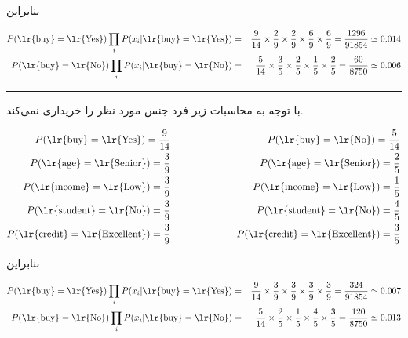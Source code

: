 \documentclass{article}
\begin{document}
بنابراین

\begin{eqnarray*}
    P(\text{\lr{buy}}=\text{\lr{Yes}})\prod_{i} P(x_i|\text{\lr{buy}}=\text{\lr{Yes}}) & = &  \frac{9}{14} \times \frac{2}{9} \times \frac{2}{9} \times \frac{6}{9} \times \frac{6}{9} =  \frac{1296}{91854} \simeq 0.014\\
    P(\text{\lr{buy}}=\text{\lr{No}})\prod_{i} P(x_i|\text{\lr{buy}}=\text{\lr{No}})  & = & \frac{5}{14} \times \frac{3}{5} \times \frac{2}{5} \times \frac{1}{5} \times \frac{2}{5} = \frac{60}{8750} \simeq 0.006
\end{eqnarray*}

\begin{center}
\rule{0.5\linewidth}{0.1pt}
\end{center}

با توجه به محاسبات زیر فرد  جنس مورد نظر را خریداری نمی‌کند.

\begin{eqnarray*}
    P(\text{\lr{buy}}=\text{\lr{Yes}}) = \frac{9}{14} & \hspace{2cm} & P(\text{\lr{buy}}=\text{\lr{No}}) = \frac{5}{14}\\
    P(\text{\lr{age}}=\text{\lr{Senior}}) = \frac{3}{9} & \hspace{2cm} & P(\text{\lr{age}}=\text{\lr{Senior}}) = \frac{2}{5}\\
    P(\text{\lr{income}}=\text{\lr{Low}}) = \frac{3}{9} & \hspace{2cm} & P(\text{\lr{income}}=\text{\lr{Low}}) = \frac{1}{5}\\
    P(\text{\lr{student}}=\text{\lr{No}}) = \frac{3}{9} & \hspace{2cm} & P(\text{\lr{student}}=\text{\lr{No}}) = \frac{4}{5}\\
    P(\text{\lr{credit}}=\text{\lr{Excellent}}) = \frac{3}{9} & \hspace{2cm} & P(\text{\lr{credit}}=\text{\lr{Excellent}}) = \frac{3}{5}\\
\end{eqnarray*}

بنابراین

\begin{eqnarray*}
    P(\text{\lr{buy}}=\text{\lr{Yes}})\prod_{i} P(x_i|\text{\lr{buy}}=\text{\lr{Yes}}) & = &  \frac{9}{14} \times \frac{3}{9} \times \frac{3}{9} \times \frac{3}{9} \times \frac{3}{9} =  \frac{324}{91854} \simeq 0.007\\
    P(\text{\lr{buy}}=\text{\lr{No}})\prod_{i} P(x_i|\text{\lr{buy}}=\text{\lr{No}})  & = & \frac{5}{14} \times \frac{2}{5} \times \frac{1}{5} \times \frac{4}{5} \times \frac{3}{5} = \frac{120}{8750} \simeq 0.013
\end{eqnarray*}
\end{document}
